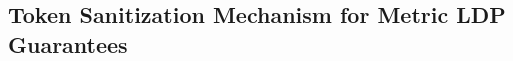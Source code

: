 

    





\subsection{Token Sanitization Mechanism for Metric LDP Guarantees}\label{sec:clusant_mldp_mech}


